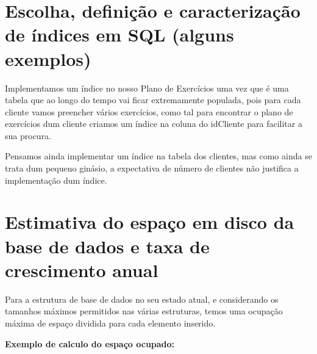 \section{Escolha, definição e caracterização de índices em SQL (alguns exemplos)}
Implementamos um índice no nosso Plano de Exercícios uma vez que é uma tabela que ao longo do tempo vai ficar extremamente populada, pois para cada cliente vamos preencher vários exercícios, como tal para encontrar o plano de exercícios dum cliente criamos um índice na coluna do idCliente para facilitar a sua procura.
\par Pensamos ainda implementar um índice na tabela dos clientes, mas como ainda se trata dum pequeno ginásio, a expectativa de número de clientes não justifica a implementação dum índice. 

\clearpage
\section{Estimativa do espaço em disco da base de dados e taxa de crescimento anual}
Para a estrutura de base de dados no seu estado atual, e considerando os tamanhos máximos permitidos nas várias estruturas, temos uma ocupação máxima  de espaço dividida para cada elemento inserido.

\textbf{Exemplo de calculo do espaço ocupado:}

